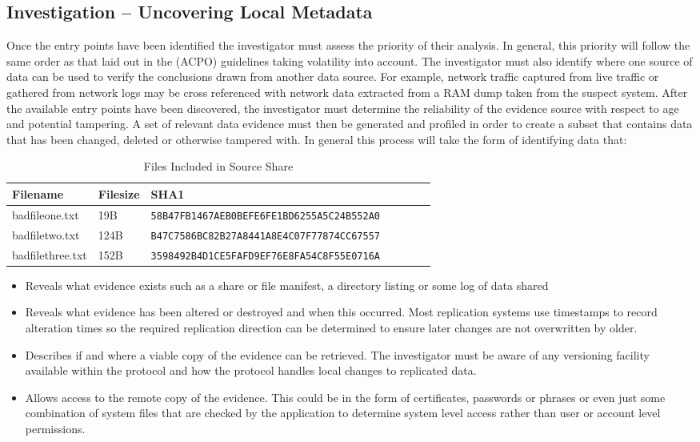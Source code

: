 \documentclass{jdfsl}
\begin{document}
\subsection{Investigation -- Uncovering Local Metadata}
Once the entry points have been identified the investigator must assess the priority of their analysis. In general, this priority will follow the same order as that laid out in the \citet{acpo} (ACPO) guidelines taking volatility into account.  The investigator must also identify where one source of data can be used to verify the conclusions drawn from another data source. For example, network traffic captured from live traffic or gathered from network logs may be cross referenced with network data extracted from a RAM dump taken from the suspect system. After the available entry points have been discovered, the investigator must determine the reliability of the evidence source with respect to age and potential tampering. A set of relevant data evidence must then be generated and profiled in order to create a subset that contains data that has been changed, deleted or otherwise tampered with. In general this process will take the form of identifying data that:


\begin{table*}[!htpb]
\centering
    \begin{tabular}{|l|l|l|l|l|l|l|}
    \hline
    \textbf{Filename} & \textbf{Filesize} & \textbf{SHA1}  \\ \hline
badfileone.txt & 19B & \texttt{58B47FB1467AEB0BEFE6FE1BD6255A5C24B552A0} \\ \hline
    badfiletwo.txt & 124B & \texttt{B47C7586BC82B27A8441A8E4C07F77874CC67557}  \\ \hline
    badfilethree.txt  & 152B & \texttt{3598492B4D1CE5FAFD9EF76E8FA54C8F55E0716A} \\ \hline
    \end{tabular}
\caption{Files Included in Source Share}
\label{listofiles}
\end{table*}


\begin{itemize}
\item Reveals what evidence exists such as a share or file manifest, a directory listing or some log of data shared
\item Reveals what evidence has been altered or destroyed and when this occurred. Most replication systems use timestamps to record alteration times so the required replication direction can be determined to ensure later changes are not overwritten by older. 
\item Describes if and where a viable copy of the evidence can be retrieved. The investigator must be aware of any versioning facility available within the protocol and how the protocol handles local changes to replicated data.
\item Allows access to the remote copy of the evidence. This could be in the form of certificates, passwords or phrases or even just some combination of system files that are checked by the application to determine system level access rather than user or account level permissions.\\
\end{itemize}
\end{document}
